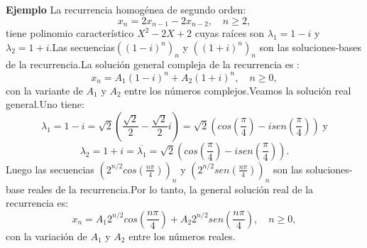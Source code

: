{\bf Ejemplo }La recurrencia homogénea de segundo orden:
$$
x_{n}=2x_{n-1}-2x_{n-2}, \quad n\geq 2,
$$
tiene polinomio característico $ X^{2}-2X+2 $ cuyas raíces son $ \lambda_{1}=1-i $ y $ \lambda_{2}=1+i $.Las secuencias$ ((1-i)^{n})_{n} $ y $ ((1+i)^{n})_{n} $ son las soluciones-bases de la recurrencia.La solución general compleja de la recurrencia es :
$$
x_{n}=A_{1}(1-i)^{n}+A_{2}(1+i)^{n}, \quad n \geq 0,
$$
con la variante de $ A_{1} $ y $ A_{2} $ entre los números complejos.Veamos la solución real general.Uno tiene:
$$
\lambda_{1}=1-i=\sqrt{2}\left(\frac{\sqrt{2}}{2}-\frac{\sqrt{2}}{2}i \right)=\sqrt{2}\left(cos\left( \frac{\pi}{4}\right )-isen\left(\frac{\pi}{4} \right)        \right) \; \text{y}
$$
$$
\lambda_{2}=1+i=\overline{\lambda_{1}}=\sqrt{2}\left(cos\left(\frac{\pi}{4}\right)-isen\left (\frac{\pi}{4}\right )   \right).
$$
Luego las secuencias $\displaystyle \left(2^{n/2}cos\left( \frac{n\pi}{4}\right)\right)_{n} $ y $\displaystyle \left(2^{n/2}sen\left( \frac{n\pi}{4}\right)\right)_{n}  $ son las soluciones-base reales de la recurrencia.Por lo tanto, la general solución real de la recurrencia es:
$$
x_{n}=A_{1}2^{n/2}cos\left(\frac{n\pi}{4}\right )+A_{2}2^{n/2}sen\left( \frac{n\pi}{4} \right ),\quad n\geq 0,
$$
con la variación de $ A_{1} $ y $ A_{2} $ entre los números reales.